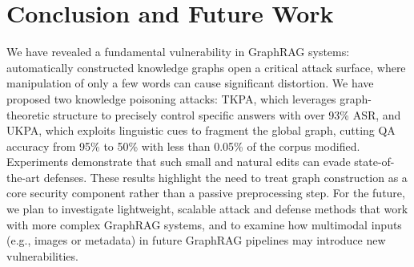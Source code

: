 \documentclass[letterpaper]{article} %
\begin{document}



\section{Conclusion and Future Work}
We have revealed a fundamental vulnerability in GraphRAG systems: automatically constructed knowledge graphs open a critical attack surface, where manipulation of only a few words can cause significant distortion. We have proposed two knowledge poisoning attacks: TKPA, which leverages graph-theoretic structure to precisely control specific answers with over 93\% ASR, and UKPA, which exploits linguistic cues to fragment the global graph, cutting QA accuracy from 95\% to 50\% with less than 0.05\% of the corpus modified.
Experiments demonstrate that such small and natural edits can evade state-of-the-art defenses.
These results highlight the need to treat graph construction as a core security component rather than a passive preprocessing step.
For the future, we plan to investigate lightweight, scalable attack and defense methods that work with more complex GraphRAG systems, and to examine how multimodal inputs (e.g., images or metadata) in future GraphRAG pipelines may introduce new vulnerabilities.
\end{document}
